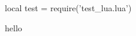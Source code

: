 \documentclass{article}
\begin{document}
 



\begin{luacode}


local test = require('test_lua.lua')

\end{luacode}





hello

%  
\end{document}
